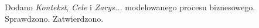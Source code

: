 \newpage

\begin{versions}
        Dodano \emph{Kontekst}, \emph{Cele} i \emph{Zarys...} modelowanego
        procesu biznesowego.
        Sprawdzono. Zatwierdzono.
\end{versions}
